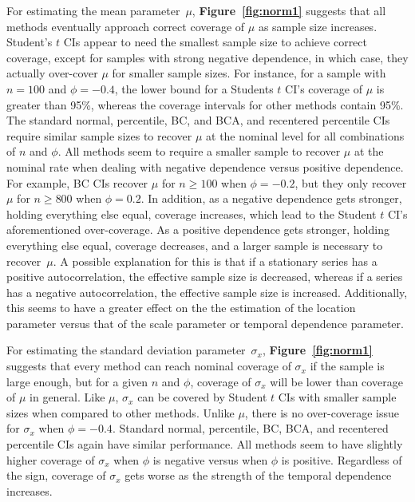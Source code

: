 \documentclass[10pt]{article}
\begin{document}
For estimating the mean parameter~$\mu$, \textbf{Figure~\ref{fig:norm1}} suggests 
that all methods eventually approach correct coverage of $\mu$ as sample size 
increases. Student's $t$ CIs appear to need the smallest sample size to achieve 
correct coverage, except for samples with strong negative dependence, in which 
case, they actually over-cover $\mu$ for smaller sample sizes. For instance, for 
a sample with $n = 100$ and $\phi = -0.4$, the lower bound for a Students $t$ 
CI's coverage of $\mu$ is greater than 95\%, whereas the coverage intervals for 
other methods contain 95\%. The standard normal, percentile, BC, and BCA, and 
recentered percentile CIs require similar sample sizes to recover $\mu$ at the 
nominal level for all combinations of $n$ and $\phi$. All methods seem to 
require a smaller sample to recover $\mu$ at the nominal rate when dealing with 
negative dependence versus positive dependence. For example, BC CIs recover 
$\mu$ for $n \geq 100$ when $\phi = -0.2$, but they only recover $\mu$ for 
$n \geq 800$ when $\phi = 0.2$. In addition, as a negative dependence gets 
stronger, holding everything else equal, coverage increases, which lead to the 
Student $t$ CI's aforementioned over-coverage. As a positive dependence gets 
stronger, holding everything else equal, coverage decreases, and a larger sample 
is necessary to recover~$\mu$. A possible explanation for this is that if a 
stationary series has a positive 
autocorrelation, the effective sample
size is decreased, whereas if a series has a negative autocorrelation, the
effective sample size is increased.\citep{geyer2011introduction}
Additionally,  this seems to have a 
greater effect on the the estimation of the location parameter versus that
of the scale parameter or temporal dependence parameter.


For estimating the standard deviation parameter~$\sigma_x$,
\textbf{Figure~\ref{fig:norm1}} suggests that every method can reach nominal 
coverage of $\sigma_x$ if the sample is large enough, but for a given $n$ and 
$\phi$, coverage of $\sigma_x$ will be lower than coverage of $\mu$ in general.
Like $\mu$, $\sigma_x$ can be covered by Student $t$ CIs with smaller sample 
sizes when compared to other methods. Unlike $\mu$, there is no over-coverage 
issue for $\sigma_x$ when $\phi = -0.4$. Standard normal, percentile, BC, BCA, and 
recentered percentile CIs again have similar performance. All methods seem to 
have slightly higher coverage of $\sigma_x$ when $\phi$ is negative versus when 
$\phi$ is positive. Regardless of the sign, coverage of $\sigma_x$ gets worse as 
the strength of the temporal dependence increases.
\end{document}
